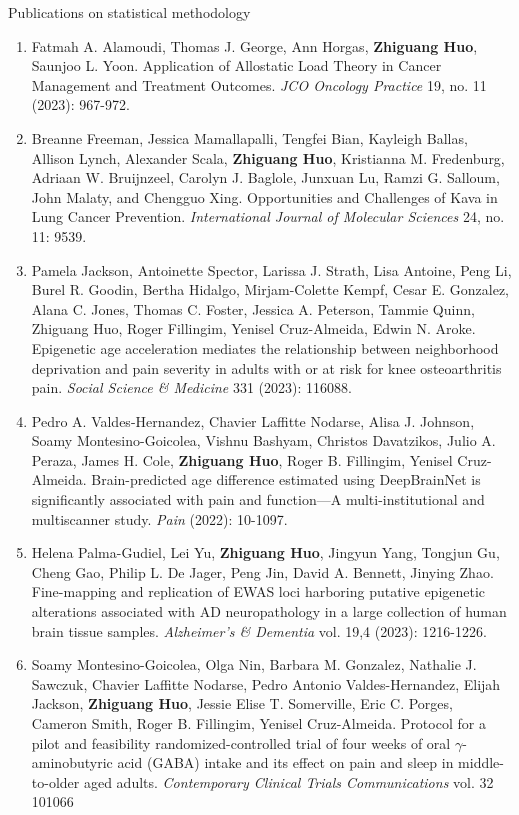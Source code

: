 \documentclass{resume} %
\begin{document}
\begin{rSection}{Publications on statistical methodology}
\begin{enumerate}[noitemsep,topsep=0pt, resume]
\item
Fatmah A. Alamoudi, Thomas J. George, Ann Horgas, {\bf Zhiguang Huo}, Saunjoo L. Yoon.  
Application of Allostatic Load Theory in Cancer Management and Treatment Outcomes.
\emph{JCO Oncology Practice} 19, no. 11 (2023): 967-972.



\item
Breanne Freeman, Jessica Mamallapalli, Tengfei Bian, Kayleigh Ballas, Allison Lynch, Alexander Scala, {\bf Zhiguang Huo}, Kristianna M. Fredenburg, Adriaan W. Bruijnzeel, Carolyn J. Baglole, Junxuan Lu, Ramzi G. Salloum, John Malaty, and Chengguo Xing. 
Opportunities and Challenges of Kava in Lung Cancer Prevention.
\emph{ International Journal of Molecular Sciences} 24, no. 11: 9539.


\item 
Pamela Jackson, Antoinette Spector, Larissa J. Strath, Lisa Antoine, Peng Li, Burel R. Goodin, Bertha Hidalgo, Mirjam-Colette Kempf, Cesar E. Gonzalez, Alana C. Jones, Thomas C. Foster, Jessica A. Peterson, Tammie Quinn, Zhiguang Huo, Roger Fillingim, Yenisel Cruz-Almeida, Edwin N. Aroke.
Epigenetic age acceleration mediates the relationship between neighborhood deprivation and pain severity in adults with or at risk for knee osteoarthritis pain. 
\emph{Social Science \& Medicine} 331 (2023): 116088.
\label{bioinfo_34} 
 


\item 
Pedro A. Valdes-Hernandez, Chavier Laffitte Nodarse, Alisa J. Johnson, Soamy  Montesino-Goicolea, Vishnu Bashyam, Christos Davatzikos, Julio A. Peraza, James H. Cole, {\bf Zhiguang Huo}, Roger B. Fillingim, Yenisel Cruz-Almeida.
Brain-predicted age difference estimated using DeepBrainNet is significantly associated with pain and function—A multi-institutional and multiscanner study. 
\emph{Pain} (2022): 10-1097.





\item
Helena Palma-Gudiel, Lei Yu, {\bf Zhiguang Huo}, Jingyun Yang, Tongjun Gu, Cheng Gao, Philip L. De Jager, Peng Jin, David A. Bennett, Jinying Zhao.
Fine-mapping and replication of EWAS loci harboring putative epigenetic alterations associated with AD neuropathology in a large collection of human brain tissue samples. 
\emph{Alzheimer's \& Dementia} vol. 19,4 (2023): 1216-1226. 
\label{bioinfo_33} 


\item Soamy Montesino-Goicolea, Olga Nin, Barbara M. Gonzalez, Nathalie J. Sawczuk, Chavier Laffitte Nodarse, Pedro Antonio Valdes-Hernandez, Elijah Jackson, {\bf Zhiguang Huo}, Jessie Elise T. Somerville, Eric C. Porges, Cameron Smith, Roger B. Fillingim, Yenisel Cruz-Almeida.
Protocol for a pilot and feasibility randomized-controlled trial of four weeks of oral $\gamma$-aminobutyric acid (GABA) intake and its effect on pain and sleep in middle-to-older aged adults.
\emph{Contemporary Clinical Trials Communications} vol. 32 101066


\end{enumerate}
\end{rSection}
\end{document}
